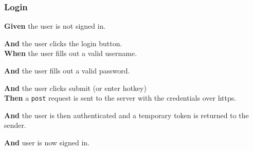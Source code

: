 \documentclass[a4paper,12pt]{article}
\begin{document}
\subsubsection{Login}
\textbf{Given} the user is not signed in.

\textbf{And} the user clicks the login button. \\
\textbf{When} the user fills out a valid username.

\textbf{And} the user fills out a valid password. 

\textbf{And} the user clicks submit (or enter hotkey) \\
\textbf{Then} a \texttt{post} request is sent to the server with the credentials over https.

\textbf{And} the user is then authenticated and a temporary token is returned to the sender.

\textbf{And} user is now signed in. \\

\end{document}
